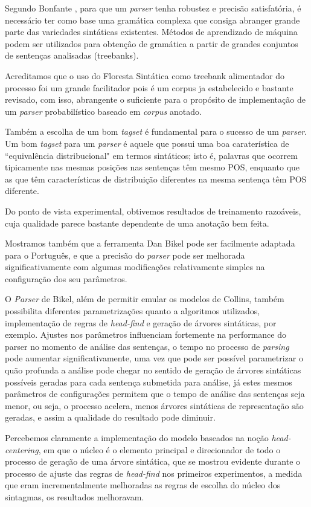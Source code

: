 Segundo Bonfante \cite{bonfante03}, para que um \emph{parser} tenha robustez e precisão satisfatória, é necessário ter como base uma gramática complexa que consiga abranger grande parte das variedades sintáticas existentes. Métodos de aprendizado de máquina podem ser utilizados para obtençâo de gramática a partir de grandes conjuntos de sentenças analisadas (treebanks). 

Acreditamos que o uso do Floresta Sintática como treebank alimentador do processo foi um grande facilitador pois é um corpus ja estabelecido e bastante revisado, com isso, abrangente o suficiente para o propósito de implementação de um \emph{parser} probabilístico baseado em \emph{corpus} anotado.

Também a escolha de um bom \emph{tagset} é fundamental para o sucesso de um \emph{parser}. Um bom \emph{tagset} para um \emph{parser} é aquele que possui uma boa caraterística de ``equivalência distribucional" em termos sintáticos; isto é, palavras que ocorrem tipicamente nas mesmas posições nas sentenças têm mesmo POS, enquanto que as que têm características de distribuição diferentes na mesma sentença têm POS diferente. 

Do ponto de vista experimental, obtivemos resultados de treinamento razoáveis, cuja qualidade parece bastante dependente de uma anotação bem feita. 

Mostramos também que a ferramenta Dan Bikel pode ser facilmente adaptada para o Português, e que a precisão do \emph{parser}
pode ser melhorada significativamente com algumas modificações relativamente simples na configuração dos seu parâmetros.

O \emph{Parser} de Bikel, além de permitir emular os modelos de Collins, também possibilita diferentes parametrizações quanto a algoritmos utilizados, implementação de regras de \emph{head-find} e geração de árvores sintáticas, por exemplo. Ajustes nos parâmetros influenciam fortemente na performance do parser no momento de análise das sentenças, o tempo no processo de \emph{parsing} pode aumentar significativamente, uma vez que pode ser possível parametrizar o quão profunda a análise pode chegar no sentido de geração de árvores sintáticas possíveis geradas para cada sentença submetida para análise, já estes mesmos parâmetros de configurações permitem que o tempo de análise das sentenças seja menor, ou seja, o processo acelera, menos árvores sintáticas de representação são geradas, e assim a qualidade do resultado pode diminuir.

Percebemos claramente a implementação do modelo baseados na noção \emph{head-centering}, em que o núcleo é o elemento principal e direcionador de todo o processo de geração de uma árvore sintática, que se mostrou evidente durante o processo de ajuste das regras de \emph{head-find} nos primeiros experimentos, a medida que eram incrementalmente melhoradas as regras de escolha do núcleo dos sintagmas, os resultados melhoravam.

